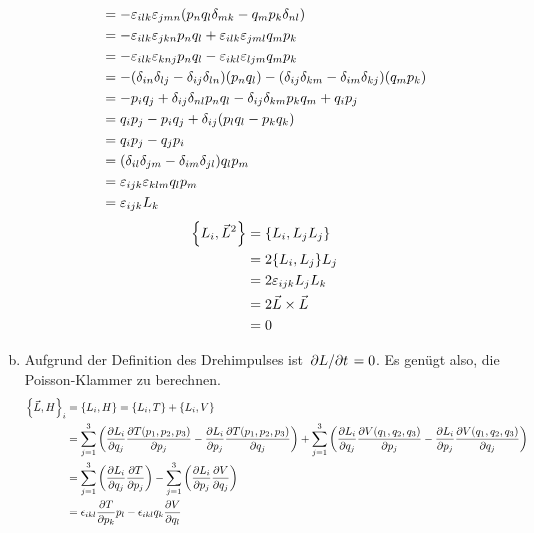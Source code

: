 \documentclass{article}
\theoremstyle{definition}
\begin{document}
\begin{enumerate}[(a)]
\begin{align*}
        &= -\varepsilon_{ilk}\varepsilon_{jmn} \qty(p_nq_l\delta_{mk} - q_mp_k\delta_{nl})\\
        &= -\varepsilon_{ilk}\varepsilon_{jkn} p_nq_l + \varepsilon_{ilk}\varepsilon_{jml} q_mp_k\\
        &= -\varepsilon_{ilk}\varepsilon_{knj} p_nq_l - \varepsilon_{ikl}\varepsilon_{ljm} q_mp_k\\
        &= -\qty(\delta_{in}\delta_{lj} - \delta_{ij}\delta_{ln})(p_nq_l) - \qty(\delta_{ij}\delta_{km} - \delta_{im}\delta_{kj})(q_mp_k)\\
        &= - p_iq_j + \delta_{ij}\delta_{nl}p_nq_l - \delta_{ij}\delta_{km} p_kq_m + q_ip_j\\
        &= q_ip_j - p_iq_j + \delta_{ij}(p_lq_l - p_kq_k)\\
        &= q_ip_j - q_jp_i\\
        &= (\delta_{il}\delta_{jm} - \delta_{im}\delta_{jl}) q_lp_m\\
        &= \varepsilon_{ijk} \varepsilon_{klm} q_lp_m\\
        &= \varepsilon_{ijk} L_k
    \end{align*}
    \begin{align*}
        \qty{L_i, \vec{L}^2} &= \qty{L_i, L_jL_j}\\
        &= 2\qty{L_i,L_j}L_j\\
        &= 2 \varepsilon_{ijk}L_jL_k\\
        &= 2 \vec{L} \times \vec{L}\\
        &= 0
    \end{align*}
    \item Aufgrund der Definition des Drehimpulses ist $\pdv*{L}{t} = 0$. Es genügt also, die Poisson-Klammer zu berechnen.
    \begin{align*}
        \qty{\vec{L}, H}_i &= \qty{L_i,H} = \qty{L_i,T} + \qty{L_i,V}\\
        &= \sum_{j = 1}^{3} \qty(\pdv{L_i}{q_j} \pdv{T(p_1,p_2,p_3)}{p_j} - \pdv{L_i}{p_j} \pdv{T(p_1,p_2,p_3)}{q_j}) + \sum_{j = 1}^{3} \qty(\pdv{L_i}{q_j} \pdv{V(q_1,q_2,q_3)}{p_j} - \pdv{L_i}{p_j} \pdv{V(q_1,q_2,q_3)}{q_j})\\
        &= \sum_{j = 1}^{3} \qty(\pdv{L_i}{q_j} \pdv{T}{p_j}) - \sum_{j = 1}^{3} \qty(\pdv{L_i}{p_j} \pdv{V}{q_j})\\
        &= \epsilon_{ikl} \pdv{T}{p_k}p_l - \epsilon_{ikl} q_k\pdv{V}{q_l}
    \end{align*}
\end{enumerate}
\end{document}
